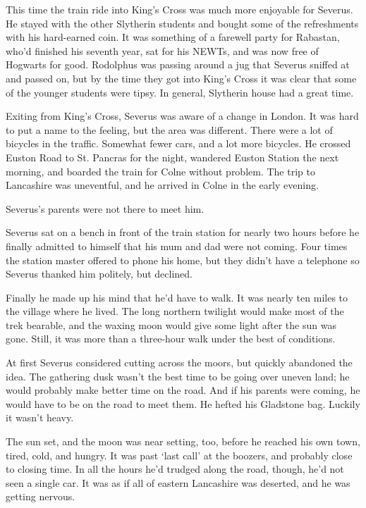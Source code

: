 \documentclass[a4paper,11pt]{article}
\begin{document}
This time the train ride into King's Cross was much more enjoyable for Severus. He stayed with the other Slytherin students and bought some of the refreshments with his hard-earned coin. It was something of a farewell party for Rabastan, who'd finished his seventh year, sat for his NEWTs, and was now free of Hogwarts for good. Rodolphus was passing around a jug that Severus sniffed at and passed on, but by the time they got into King's Cross it was clear that some of the younger students were tipsy. In general, Slytherin house had a great time.

Exiting from King's Cross, Severus was aware of a change in London. It was hard to put a name to the feeling, but the area was different. There were a lot of bicycles in the traffic. Somewhat fewer cars, and a lot more bicycles. He crossed Euston Road to St. Pancras for the night, wandered Euston Station the next morning, and boarded the train for Colne without problem. The trip to Lancashire was uneventful, and he arrived in Colne in the early evening.

Severus's parents were not there to meet him.

Severus sat on a bench in front of the train station for nearly two hours before he finally admitted to himself that his mum and dad were not coming. Four times the station master offered to phone his home, but they didn't have a telephone so Severus thanked him politely, but declined.

Finally he made up his mind that he'd have to walk. It was nearly ten miles to the village where he lived. The long northern twilight would make most of the trek bearable, and the waxing moon would give some light after the sun was gone. Still, it was more than a three-hour walk under the best of conditions.

At first Severus considered cutting across the moors, but quickly abandoned the idea. The gathering dusk wasn't the best time to be going over uneven land; he would probably make better time on the road. And if his parents were coming, he would have to be on the road to meet them. He hefted his Gladstone bag. Luckily it wasn't heavy.

The sun set, and the moon was near setting, too, before he reached his own town, tired, cold, and hungry. It was past `last call' at the boozers, and probably close to closing time. In all the hours he'd trudged along the road, though, he'd not seen a single car. It was as if all of eastern Lancashire was deserted, and he was getting nervous.
\end{document}
